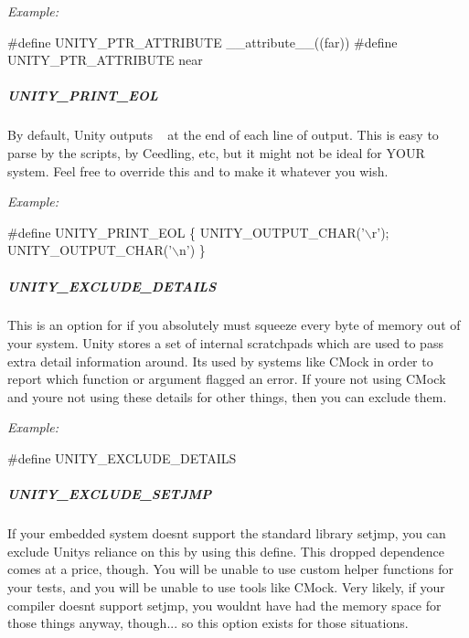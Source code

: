 {\itshape Example\+:} 
\begin{DoxyCode}
\textcolor{preprocessor}{#define UNITY\_PTR\_ATTRIBUTE \_\_attribute\_\_((far))}
\textcolor{preprocessor}{#define UNITY\_PTR\_ATTRIBUTE near}
\end{DoxyCode}


\subparagraph*{{\ttfamily U\+N\+I\+T\+Y\+\_\+\+P\+R\+I\+N\+T\+\_\+\+E\+OL}}

By default, Unity outputs ~\newline
 at the end of each line of output. This is easy to parse by the scripts, by Ceedling, etc, but it might not be ideal for Y\+O\+UR system. Feel free to override this and to make it whatever you wish.

{\itshape Example\+:} 
\begin{DoxyCode}
\textcolor{preprocessor}{#define UNITY\_PRINT\_EOL \{ UNITY\_OUTPUT\_CHAR('\(\backslash\)r'); UNITY\_OUTPUT\_CHAR('\(\backslash\)n') \}}
\end{DoxyCode}


\subparagraph*{{\ttfamily U\+N\+I\+T\+Y\+\_\+\+E\+X\+C\+L\+U\+D\+E\+\_\+\+D\+E\+T\+A\+I\+LS}}

This is an option for if you absolutely must squeeze every byte of memory out of your system. Unity stores a set of internal scratchpads which are used to pass extra detail information around. It\textquotesingle{}s used by systems like C\+Mock in order to report which function or argument flagged an error. If you\textquotesingle{}re not using C\+Mock and you\textquotesingle{}re not using these details for other things, then you can exclude them.

{\itshape Example\+:} 
\begin{DoxyCode}
\textcolor{preprocessor}{#define UNITY\_EXCLUDE\_DETAILS}
\end{DoxyCode}


\subparagraph*{{\ttfamily U\+N\+I\+T\+Y\+\_\+\+E\+X\+C\+L\+U\+D\+E\+\_\+\+S\+E\+T\+J\+MP}}

If your embedded system doesn\textquotesingle{}t support the standard library setjmp, you can exclude Unity\textquotesingle{}s reliance on this by using this define. This dropped dependence comes at a price, though. You will be unable to use custom helper functions for your tests, and you will be unable to use tools like C\+Mock. Very likely, if your compiler doesn\textquotesingle{}t support setjmp, you wouldn\textquotesingle{}t have had the memory space for those things anyway, though... so this option exists for those situations.

